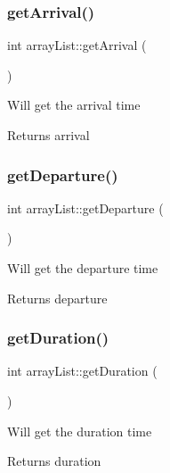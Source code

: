 \subsubsection{\texorpdfstring{get\+Arrival()}{getArrival()}}
{\footnotesize\ttfamily int array\+List\+::get\+Arrival (\begin{DoxyParamCaption}{ }\end{DoxyParamCaption})}

Will get the arrival time \begin{DoxyReturn}{Returns}
arrival 
\end{DoxyReturn}
\mbox{\label{classarray_list_ac0bb8425cf62f6b0c0d934a896ffbdf7}} 
\subsubsection{\texorpdfstring{get\+Departure()}{getDeparture()}}
{\footnotesize\ttfamily int array\+List\+::get\+Departure (\begin{DoxyParamCaption}{ }\end{DoxyParamCaption})}

Will get the departure time \begin{DoxyReturn}{Returns}
departure 
\end{DoxyReturn}
\mbox{\label{classarray_list_a52d99fb592985f14e4638380d1570bd1}} 
\subsubsection{\texorpdfstring{get\+Duration()}{getDuration()}}
{\footnotesize\ttfamily int array\+List\+::get\+Duration (\begin{DoxyParamCaption}{ }\end{DoxyParamCaption})}

Will get the duration time \begin{DoxyReturn}{Returns}
duration 
\end{DoxyReturn}
\mbox{\label{classarray_list_a5351c85d664c32c1d7545c25076e3e5e}} 
